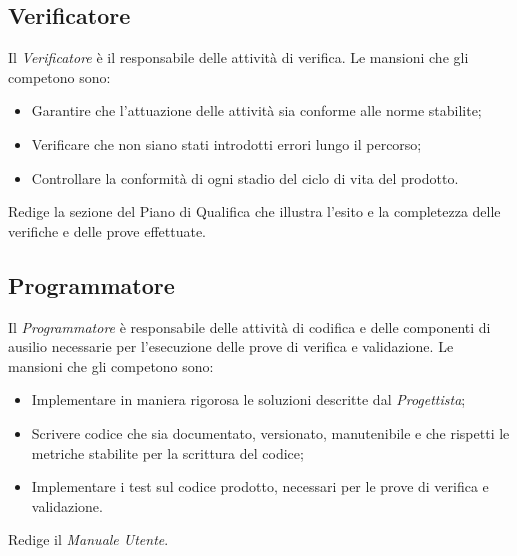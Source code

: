 \subsection{Verificatore}
Il \textit{Verificatore} è il responsabile delle attività di verifica. Le mansioni che gli competono sono:
\begin{itemize}
	\item Garantire che l'attuazione delle attività sia conforme alle norme stabilite;
	\item Verificare che non siano stati introdotti errori lungo il percorso;
	\item Controllare la conformità di ogni stadio del ciclo di vita del prodotto.
\end{itemize}
Redige la sezione del Piano di Qualifica che illustra l'esito e la completezza delle verifiche
e delle prove effettuate.

\subsection{Programmatore}
Il \textit{Programmatore} è responsabile delle attività di codifica e delle componenti di ausilio necessarie per l'esecuzione delle prove di verifica e validazione. Le mansioni che gli competono sono:
\begin{itemize}
	\item Implementare in maniera rigorosa le soluzioni descritte dal \textit{Progettista};
	\item Scrivere codice che sia documentato, versionato, manutenibile e che rispetti le metriche stabilite per la scrittura del codice;
	\item Implementare i test sul codice prodotto, necessari per le prove di verifica e validazione.
\end{itemize}
Redige il \textit{Manuale Utente}.
